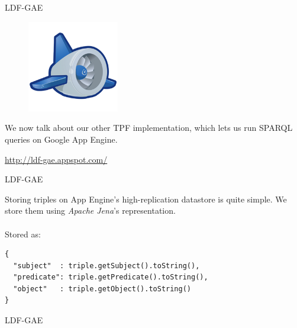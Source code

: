 \documentclass[20pt]{extarticle}
\newcommand{\cmr}{\fontencoding{T1}\fontfamily{ptm}\selectfont} %
\begin{document}
{\newpage

\begin{center}
{\fontsize{35}{35}\color{blue} \sc LDF-GAE}
\end{center}
\vspace{10 mm}
\begin{figure}[ht!]
\centering
\includegraphics[width=40mm]{appengine-logo.png}
\end{figure}
{\fontsize{30}{30} {\cmr 
\noindent We now talk about our other TPF implementation, which lets us run SPARQL queries on {\color{blue}Google App Engine}.

\begin{center}
\url{http://ldf-gae.appspot.com/}
\end{center}
}} 


\newpage

\begin{center}
{\fontsize{35}{35}\color{blue} \sc LDF-GAE}
\end{center}
\vspace{20 mm}

{\fontsize{30}{30} {\cmr 
\noindent Storing triples on App Engine's high-replication datastore is quite simple. We store them using \textit{Apache Jena}'s representation.
\\ \\
{\color{blue}Stored as:}
}} 
\begin{center}
\begin{small}
\begin{verbatim}
{
  "subject"  : triple.getSubject().toString(),
  "predicate": triple.getPredicate().toString(),
  "object"   : triple.getObject().toString()
}
\end{verbatim}
\end{small}
\end{center}


\newpage

\begin{center}
{\fontsize{35}{35}\color{blue} \sc LDF-GAE}
\end{center}
\vspace{20 mm}

}
\end{document}
